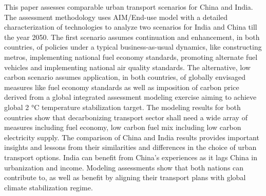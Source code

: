 This paper assesses comparable urban transport scenarios for China and India. The assessment methodology uses AIM/End-use model with a detailed characterization of technologies to analyze two scenarios for India and China till the year 2050. The first scenario assumes continuation and enhancement, in both countries, of policies under a typical business-as-usual dynamics, like constructing metros, implementing national fuel economy standards, promoting alternate fuel vehicles and implementing national air quality standards. The alternative, low carbon scenario assumes application, in both countries, of globally envisaged measures like fuel economy standards as well as imposition of carbon price derived from a global integrated assessment modeling exercise aiming to achieve global 2 °C temperature stabilization target. The modeling results for both countries show that decarbonizing transport sector shall need a wide array of measures including fuel economy, low carbon fuel mix including low carbon electricity supply. The comparison of China and India results provides important insights and lessons from their similarities and differences in the choice of urban transport options. India can benefit from China’s experiences as it lags China in urbanization and income. Modeling assessments show that both nations can contribute to, as well as benefit by aligning their transport plans with global climate stabilization regime.